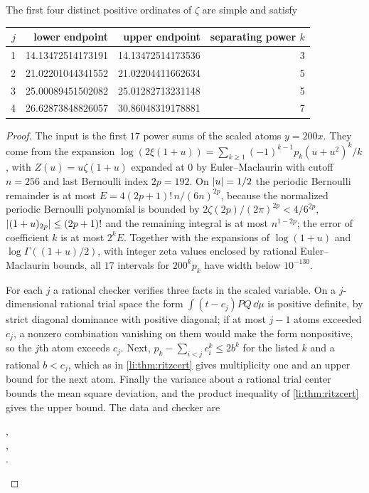 \begin{proposition}\label{li:prop:ritz17}
The first four distinct positive ordinates of $\zeta$ are simple and satisfy
\begin{center}\small
\begin{tabular}{rrrr}
\toprule
$j$ & lower endpoint & upper endpoint & separating power $k$\\
\midrule
1 & 14.13472514173191 & 14.13472514173536 & 3\\
2 & 21.02201044341552 & 21.02204411662634 & 5\\
3 & 25.00089451502082 & 25.01282713231148 & 5\\
4 & 26.62873848826057 & 30.86048319178881 & 7\\
\bottomrule
\end{tabular}
\end{center}
\end{proposition}

\begin{proof}
The input is the first $17$ power sums of the scaled atoms $y=200x$. They come from the expansion
$\log(2\xi(1+u))=\sum_{k\ge1}(-1)^{k-1}p_k(u+u^2)^k/k$, with $Z(u)=u\zeta(1+u)$ expanded at $0$ by
Euler--Maclaurin with cutoff $n=256$ and last Bernoulli index $2p=192$. On $\lvert u\rvert=1/2$ the
periodic Bernoulli remainder is at most $E=4(2p+1)!\,n/(6n)^{2p}$, because the normalized periodic
Bernoulli polynomial is bounded by $2\zeta(2p)/(2\pi)^{2p}<4/6^{2p}$, $\lvert(1+u)_{2p}\rvert\le(2p+1)!$ and
the remaining integral is at most $n^{1-2p}$; the error of coefficient $k$ is at most $2^kE$.
Together with the expansions of $\log(1+u)$ and $\log\Gamma((1+u)/2)$, with integer zeta values
enclosed by rational Euler--Maclaurin bounds, all $17$ intervals for $200^kp_k$ have width below
$10^{-130}$.

For each $j$ a rational checker verifies three facts in the scaled variable. On a $j$-dimensional
rational trial space the form $\int(t-c_j)PQ\,\dd\mu$ is positive definite, by strict diagonal
dominance with positive diagonal; if at most $j-1$ atoms exceeded $c_j$, a nonzero combination
vanishing on them would make the form nonpositive, so the $j$th atom exceeds $c_j$. Next,
$p_k-\sum_{i<j}c_i^k\le2b^k$ for the listed $k$ and a rational $b<c_j$, which as in
\cref{li:thm:ritzcert} gives multiplicity one and an upper bound for the next atom. Finally the
variance about a rational trial center bounds the mean square deviation, and the product inequality
of \cref{li:thm:ritzcert} gives the upper bound. The data and checker are
\begin{center}
,\\
,\\
.
\end{center}
\end{proof}

